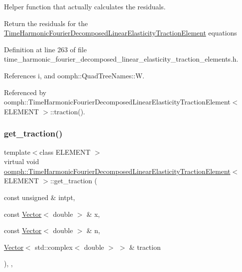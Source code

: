 Helper function that actually calculates the residuals. 

Return the residuals for the \hyperlink{classoomph_1_1TimeHarmonicFourierDecomposedLinearElasticityTractionElement}{Time\+Harmonic\+Fourier\+Decomposed\+Linear\+Elasticity\+Traction\+Element} equations 

Definition at line 263 of file time\+\_\+harmonic\+\_\+fourier\+\_\+decomposed\+\_\+linear\+\_\+elasticity\+\_\+traction\+\_\+elements.\+h.



References i, and oomph\+::\+Quad\+Tree\+Names\+::W.



Referenced by oomph\+::\+Time\+Harmonic\+Fourier\+Decomposed\+Linear\+Elasticity\+Traction\+Element$<$ E\+L\+E\+M\+E\+N\+T $>$\+::traction().

\mbox{\label{classoomph_1_1TimeHarmonicFourierDecomposedLinearElasticityTractionElement_a5a6e310366d2c1a02942b346d82a6c5c}} 
\subsubsection{\texorpdfstring{get\+\_\+traction()}{get\_traction()}}
{\footnotesize\ttfamily template$<$class E\+L\+E\+M\+E\+NT $>$ \\
virtual void \hyperlink{classoomph_1_1TimeHarmonicFourierDecomposedLinearElasticityTractionElement}{oomph\+::\+Time\+Harmonic\+Fourier\+Decomposed\+Linear\+Elasticity\+Traction\+Element}$<$ E\+L\+E\+M\+E\+NT $>$\+::get\+\_\+traction (\begin{DoxyParamCaption}\item[{const unsigned \&}]{intpt,  }\item[{const \hyperlink{classoomph_1_1Vector}{Vector}$<$ double $>$ \&}]{x,  }\item[{const \hyperlink{classoomph_1_1Vector}{Vector}$<$ double $>$ \&}]{n,  }\item[{\hyperlink{classoomph_1_1Vector}{Vector}$<$ std\+::complex$<$ double $>$ $>$ \&}]{traction }\end{DoxyParamCaption})\hspace{0.3cm}{\ttfamily [inline]}, {\ttfamily [protected]}, {\ttfamily [virtual]}}



